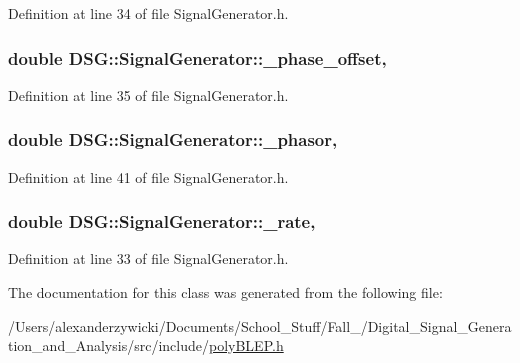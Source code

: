 Definition at line 34 of file Signal\-Generator.\-h.

\hypertarget{classDSG_1_1SignalGenerator_a9abf9d00c798e0fdca6314f17547758a}{
\subsubsection[{\-\_\-phase\-\_\-offset}]{\setlength{\rightskip}{0pt plus 5cm}double D\-S\-G\-::\-Signal\-Generator\-::\-\_\-phase\-\_\-offset\hspace{0.3cm}{\ttfamily [protected]}, {\ttfamily [inherited]}}}\label{classDSG_1_1SignalGenerator_a9abf9d00c798e0fdca6314f17547758a}


Definition at line 35 of file Signal\-Generator.\-h.

\hypertarget{classDSG_1_1SignalGenerator_ac2271b582bf699275f077ecb642a8cd9}{
\subsubsection[{\-\_\-phasor}]{\setlength{\rightskip}{0pt plus 5cm}double D\-S\-G\-::\-Signal\-Generator\-::\-\_\-phasor\hspace{0.3cm}{\ttfamily [protected]}, {\ttfamily [inherited]}}}\label{classDSG_1_1SignalGenerator_ac2271b582bf699275f077ecb642a8cd9}


Definition at line 41 of file Signal\-Generator.\-h.

\hypertarget{classDSG_1_1SignalGenerator_aa10f6c85d9adee901139ea7fb346f39d}{
\subsubsection[{\-\_\-rate}]{\setlength{\rightskip}{0pt plus 5cm}double D\-S\-G\-::\-Signal\-Generator\-::\-\_\-rate\hspace{0.3cm}{\ttfamily [protected]}, {\ttfamily [inherited]}}}\label{classDSG_1_1SignalGenerator_aa10f6c85d9adee901139ea7fb346f39d}


Definition at line 33 of file Signal\-Generator.\-h.



The documentation for this class was generated from the following file\-:\begin{DoxyCompactItemize}
\item 
/\-Users/alexanderzywicki/\-Documents/\-School\-\_\-\-Stuff/\-Fall\-\_/\-Digital\-\_\-\-Signal\-\_\-\-Generation\-\_\-and\-\_\-\-Analysis/src/include/\hyperlink{polyBLEP_8h}{poly\-B\-L\-E\-P.\-h}\end{DoxyCompactItemize}
